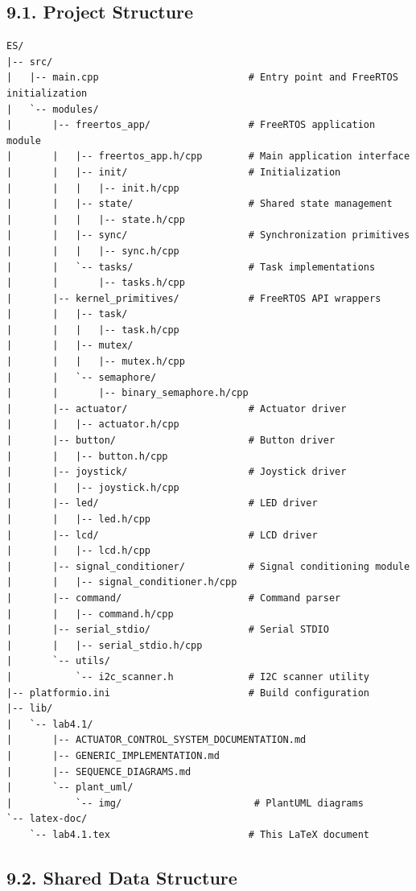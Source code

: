 \documentclass[12pt]{article}
\begin{document}
\subsection*{9.1. Project Structure}

\begin{verbatim}
ES/
|-- src/
|   |-- main.cpp                          # Entry point and FreeRTOS initialization
|   `-- modules/
|       |-- freertos_app/                 # FreeRTOS application module
|       |   |-- freertos_app.h/cpp        # Main application interface
|       |   |-- init/                     # Initialization
|       |   |   |-- init.h/cpp
|       |   |-- state/                    # Shared state management
|       |   |   |-- state.h/cpp
|       |   |-- sync/                     # Synchronization primitives
|       |   |   |-- sync.h/cpp
|       |   `-- tasks/                    # Task implementations
|       |       |-- tasks.h/cpp
|       |-- kernel_primitives/            # FreeRTOS API wrappers
|       |   |-- task/
|       |   |   |-- task.h/cpp
|       |   |-- mutex/
|       |   |   |-- mutex.h/cpp
|       |   `-- semaphore/
|       |       |-- binary_semaphore.h/cpp
|       |-- actuator/                     # Actuator driver
|       |   |-- actuator.h/cpp
|       |-- button/                       # Button driver
|       |   |-- button.h/cpp
|       |-- joystick/                     # Joystick driver
|       |   |-- joystick.h/cpp
|       |-- led/                          # LED driver
|       |   |-- led.h/cpp
|       |-- lcd/                          # LCD driver
|       |   |-- lcd.h/cpp
|       |-- signal_conditioner/           # Signal conditioning module
|       |   |-- signal_conditioner.h/cpp
|       |-- command/                      # Command parser
|       |   |-- command.h/cpp
|       |-- serial_stdio/                 # Serial STDIO
|       |   |-- serial_stdio.h/cpp
|       `-- utils/
|           `-- i2c_scanner.h             # I2C scanner utility
|-- platformio.ini                        # Build configuration
|-- lib/
|   `-- lab4.1/
|       |-- ACTUATOR_CONTROL_SYSTEM_DOCUMENTATION.md
|       |-- GENERIC_IMPLEMENTATION.md
|       |-- SEQUENCE_DIAGRAMS.md
|       `-- plant_uml/
|           `-- img/                       # PlantUML diagrams
`-- latex-doc/
    `-- lab4.1.tex                        # This LaTeX document
\end{verbatim}

\subsection*{9.2. Shared Data Structure}
\end{document}
